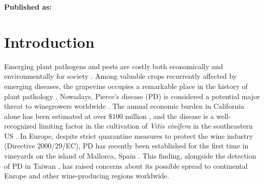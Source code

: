 \vspace{3cm}





\textbf{Published as:}

\vspace{0.5cm}


\newpage
\section{Introduction}
Emerging plant pathogens and pests are costly both economically and
environmentally for society
\cite{Carvajal2019,Mooney2001,Pimentel2000,Spence2020}. Among valuable crops
recurrently affected by emerging diseases, the grapevine occupies a remarkable
place in the history of plant pathology \cite{Borkarbook, Brewer2010,
    Rouxel2014, Tello2019}. Nowadays, Pierce's disease (PD) is considered a
potential major threat to winegrowers worldwide \cite{Hopkins2002}. The annual
economic burden in California alone has been estimated at over $\$ 100$ million
\cite{Tumber2014}, and the disease is a well-recognized limiting factor in the
cultivation of \textit{Vitis vinifera} in the southeastern US
\cite{Hopkins2002}. In Europe, despite strict quarantine measures to protect
the wine industry (Directive 2000/29/EC), PD has recently been established for
the first time in vineyards on the island of Mallorca, Spain \cite{Gomila2019,
    Moralejo2019}. This finding, alongside the detection of PD in Taiwan
\cite{Su2013}, has raised concerns about its possible spread to continental
Europe and other wine-producing regions worldwide.

